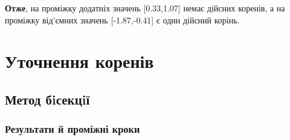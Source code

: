 \documentclass[a4paper,14pt]{extarticle} %
\begin{document}
\begin{center}
    \begin{table}[h!]
        \centering
        \caption{Знаки поліномів Штурма}
    \end{table}
\end{center}

\textbf{Отже}, на проміжку додатніх значень [0.33,1.07] немає дійсних коренів, 
а на проміжку від'ємних значень [-1.87,-0.41] є один дійсний корінь.

\newpage

\section{Уточнення коренів}

\subsection{Метод бiсекцiї}



\subsubsection*{Результати й проміжні кроки}
\end{document}
